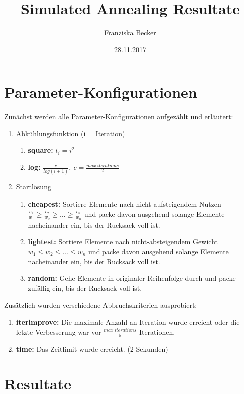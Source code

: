 \documentclass[11pt,a4paper]{article}
\title{\vspace{-2cm}Simulated Annealing Resultate}
\author{Franziska Becker}
\date{28.11.2017}
\begin{document}
\maketitle

\section{Parameter-Konfigurationen}

Zunächst werden alle Parameter-Konfigurationen aufgezählt und erläutert:
\begin{enumerate}
    \item Abkühlungsfunktion (i = Iteration)
      \begin{enumerate}
        \item \textbf{square:} \(t_i = i^2\)
            \item \textbf{log:} \(\frac{c}{log(i+1)},~c = \frac{max~iterations}{2}\)
      \end{enumerate}
    \item Startlösung
      \begin{enumerate}
        \item \textbf{cheapest:} Sortiere Elemente nach nicht-aufsteigendem Nutzen \(\frac{c_1}{w_1} \geq \frac{c_2}{w_2} \geq \dots \geq \frac{c_n}{w_n}\) und packe davon ausgehend solange Elemente nacheinander ein, bis der Rucksack voll ist.
            \item \textbf{lightest:} Sortiere Elemente nach nicht-absteigendem Gewicht \(w_1 \leq w_2 \leq \dots \leq w_n\) und packe davon ausgehend solange Elemente nacheinander ein, bis der Rucksack voll ist.
            \item \textbf{random:} Gehe Elemente in originaler Reihenfolge durch und packe zufällig ein, bis der Rucksack voll ist.
      \end{enumerate}
\end{enumerate}

Zusätzlich wurden verschiedene Abbruchskriterien ausprobiert:
\begin{enumerate}
    \item \textbf{iterimprove:} Die maximale Anzahl an Iteration wurde erreicht oder die letzte Verbesserung war vor \(\frac{max~iterations}{5}\) Iterationen.
    \item \textbf{time:} Das Zeitlimit wurde erreicht. (2 Sekunden)
\end{enumerate}

\section{Resultate}
\end{document}

